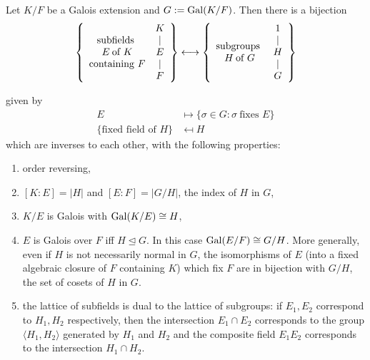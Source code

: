 \documentclass[a4paper]{article}
\begin{document}
\begin{thm}
  Let $K/F$ be a Galois extension and $G := \operatorname{Gal}(K/F)$. Then there is a bijection
  \[
    \left\{
      \begin{array}[h]{c}
        \text{subfields } \\
        E\: \text{of } K \\
        \text{containing } F
      \end{array}
      \begin{array}[h]{c}
        K \\
        | \\
        E \\
        | \\
        F
      \end{array}
    \right\}
    \longleftrightarrow
    \left\{
      \begin{array}[h]{c}
        \text{subgroups } \\
        H \: \text{of } G
      \end{array}
      \begin{array}[h]{c}
        1 \\
        | \\
        H \\
        | \\
        G
      \end{array}
      \right\}
  \]

  given by
  \begin{align*}
    E & \mapsto \{\sigma \in G: \sigma \: \text{fixes } E\} \\
    \{\text{fixed field of } H\} & \mapsfrom H
  \end{align*}
  which are inverses to each other, with the following properties:
  \begin{enumerate}
  \item order reversing,
  \item $[K:E] = |H|$ and $[E:F] = |G/H|$, the index of $H$ in $G$,
  \item $K/E$ is Galois with $\operatorname{Gal}(K/E) \cong H$,
  \item $E$ is Galois over $F$ iff $H \trianglelefteq G$. In this case $\operatorname{Gal}(E/F) \cong G/H$. More generally, even if $H$ is not necessarily normal in $G$, the isomorphisms of $E$ (into a fixed algebraic closure of $F$ containing $K$) which fix $F$ are in bijection with $G/H$, the set of cosets of $H$ in $G$.
  \item the lattice of subfields is dual to the lattice of subgroups: if $E_1, E_2$ correspond to $H_1, H_2$ respectively, then the intersection $E_1 \cap E_2$ corresponds to the group $\langle H_1, H_2 \rangle$ generated by $H_1$ and $H_2$ and the composite field $E_1E_2$ corresponds to the intersection $H_1 \cap H_2$.
  \end{enumerate}
\end{thm}
\end{document}
